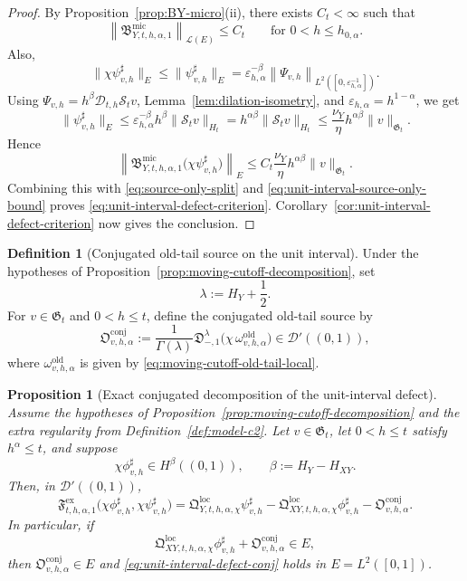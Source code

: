 \documentclass[11pt,a4paper]{amsart}
\theoremstyle{plain}
\newtheorem{proposition}[theorem]{Proposition}
\theoremstyle{definition}
\newtheorem{definition}[theorem]{Definition}
\theoremstyle{remark}
\begin{document}
\begin{proof}
By Proposition~\ref{prop:BY-micro}(ii), there exists \(C_t<\infty\) such that
\[
\left\|
\mathfrak B_{Y,t,h,\alpha,1}^{\mathrm{mic}}
\right\|_{\mathcal L(E)}
\le
C_t
\qquad\text{for }0<h\le h_{0,\alpha}.
\]
Also,
\[
\|\chi\psi_{v,h}^{\sharp}\|_{E}
\le
\|\psi_{v,h}^{\sharp}\|_{E}
=
\varepsilon_{h,\alpha}^{-\beta}
\left\|
\Psi_{v,h}
\right\|_{L^2([0,\varepsilon_{h,\alpha}^{-1}])}.
\]
Using \(\Psi_{v,h}=h^\beta\mathcal D_{t,h}\mathcal S_t v\),
Lemma~\ref{lem:dilation-isometry}, and \(\varepsilon_{h,\alpha}=h^{1-\alpha}\), we get
\[
\|\psi_{v,h}^{\sharp}\|_{E}
\le
\varepsilon_{h,\alpha}^{-\beta}h^\beta\|\mathcal S_t v\|_{H_t}
=
h^{\alpha\beta}\|\mathcal S_t v\|_{H_t}
\le
\frac{\nu_Y}{\eta}h^{\alpha\beta}\|v\|_{\mathfrak G_t}.
\]
Hence
\[
\left\|
\mathfrak B_{Y,t,h,\alpha,1}^{\mathrm{mic}}
\bigl(
\chi\psi_{v,h}^{\sharp}
\bigr)
\right\|_{E}
\le
C_t\frac{\nu_Y}{\eta}h^{\alpha\beta}\|v\|_{\mathfrak G_t}.
\]
Combining this with \eqref{eq:source-only-split} and
\eqref{eq:unit-interval-source-only-bound} proves
\eqref{eq:unit-interval-defect-criterion}. Corollary~\ref{cor:unit-interval-defect-criterion} now
gives the conclusion.
\end{proof}

\begin{definition}[Conjugated old-tail source on the unit interval]
\label{def:unit-interval-old-tail-conj}
Under the hypotheses of Proposition~\ref{prop:moving-cutoff-decomposition}, set
\[
\lambda:=H_Y+\frac12.
\]
For \(v\in\mathfrak G_t\) and \(0<h\le t\), define the conjugated old-tail source by
\begin{equation}\label{eq:unit-interval-old-tail-conj}
\mathfrak O_{v,h,\alpha}^{\mathrm{conj}}
:=
\frac{1}{\Gamma(\lambda)}
\mathfrak D_{-,1}^{\lambda}
\bigl(
\chi\,\omega_{v,h,\alpha}^{\mathrm{old}}
\bigr)
\in \mathcal D'((0,1)),
\end{equation}
where \(\omega_{v,h,\alpha}^{\mathrm{old}}\) is given by
\eqref{eq:moving-cutoff-old-tail-local}.
\end{definition}

\begin{proposition}[Exact conjugated decomposition of the unit-interval defect]
\label{prop:unit-interval-defect-conj}
Assume the hypotheses of Proposition~\ref{prop:moving-cutoff-decomposition} and the extra regularity
from Definition~\ref{def:model-c2}. Let \(v\in\mathfrak G_t\), let \(0<h\le t\) satisfy
\(h^\alpha\le t\), and suppose
\[
\chi\phi_{v,h}^{\sharp}\in H^\beta((0,1)),
\qquad
\beta:=H_Y-H_{XY}.
\]
Then, in \(\mathcal D'((0,1))\),
\begin{equation}\label{eq:unit-interval-defect-conj}
\mathfrak F_{t,h,\alpha,1}^{\mathrm{ex}}
\bigl(
\chi\phi_{v,h}^{\sharp},
\chi\psi_{v,h}^{\sharp}
\bigr)
=
\mathfrak Q_{Y,t,h,\alpha,\chi}^{\mathrm{loc}}\psi_{v,h}^{\sharp}
-\mathfrak Q_{XY,t,h,\alpha,\chi}^{\mathrm{loc}}\phi_{v,h}^{\sharp}
-\mathfrak O_{v,h,\alpha}^{\mathrm{conj}}.
\end{equation}
In particular, if
\[
\mathfrak Q_{XY,t,h,\alpha,\chi}^{\mathrm{loc}}\phi_{v,h}^{\sharp}
+
\mathfrak O_{v,h,\alpha}^{\mathrm{conj}}
\in E,
\]
then \(\mathfrak O_{v,h,\alpha}^{\mathrm{conj}}\in E\) and
\eqref{eq:unit-interval-defect-conj} holds in \(E=L^2([0,1])\).
\end{proposition}
\end{document}
